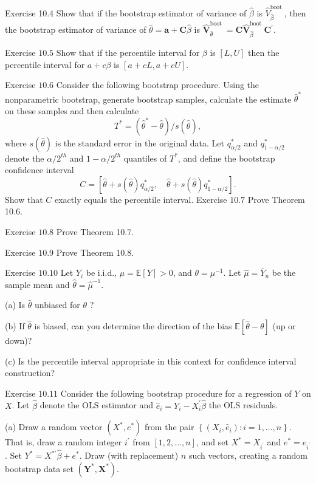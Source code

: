 \documentclass[10pt]{article}
\begin{document}
Exercise 10.4 Show that if the bootstrap estimator of variance of $\widehat{\beta}$ is $\widehat{V}_{\widehat{\beta}}^{\text {boot }}$, then the bootstrap estimator of variance of $\widehat{\theta}=\boldsymbol{a}+\boldsymbol{C} \widehat{\beta}$ is $\widehat{\boldsymbol{V}}_{\widehat{\theta}}^{\text {boot }}=\boldsymbol{C} \widehat{\boldsymbol{V}}_{\widehat{\beta}}^{\text {boot }} \boldsymbol{C}^{\prime}$.

Exercise $10.5$ Show that if the percentile interval for $\beta$ is $[L, U]$ then the percentile interval for $a+c \beta$ is $[a+c L, a+c U]$.

Exercise $10.6$ Consider the following bootstrap procedure. Using the nonparametric bootstrap, generate bootstrap samples, calculate the estimate $\widehat{\theta}^{*}$ on these samples and then calculate
$$
T^{*}=\left(\widehat{\theta}^{*}-\widehat{\theta}\right) / s(\widehat{\theta}),
$$
where $s(\hat{\theta})$ is the standard error in the original data. Let $q_{\alpha / 2}^{*}$ and $q_{1-\alpha / 2}^{*}$ denote the $\alpha / 2^{t h}$ and $1-\alpha / 2^{t h}$ quantiles of $T^{*}$, and define the bootstrap confidence interval
$$
C=\left[\widehat{\theta}+s(\widehat{\theta}) q_{\alpha / 2}^{*}, \quad \widehat{\theta}+s(\widehat{\theta}) q_{1-\alpha / 2}^{*}\right] .
$$
Show that $C$ exactly equals the percentile interval. Exercise $10.7$ Prove Theorem 10.6.

Exercise $10.8$ Prove Theorem 10.7.

Exercise $10.9$ Prove Theorem 10.8.

Exercise $10.10$ Let $Y_{i}$ be i.i.d., $\mu=\mathbb{E}[Y]>0$, and $\theta=\mu^{-1}$. Let $\widehat{\mu}=\bar{Y}_{n}$ be the sample mean and $\widehat{\theta}=\widehat{\mu}^{-1}$.

(a) Is $\hat{\theta}$ unbiased for $\theta$ ?

(b) If $\widehat{\theta}$ is biased, can you determine the direction of the bias $\mathbb{E}[\widehat{\theta}-\theta]$ (up or down)?

(c) Is the percentile interval appropriate in this context for confidence interval construction?

Exercise $10.11$ Consider the following bootstrap procedure for a regression of $Y$ on $X$. Let $\widehat{\beta}$ denote the OLS estimator and $\widehat{e}_{i}=Y_{i}-X_{i}^{\prime} \widehat{\beta}$ the OLS residuals.

(a) Draw a random vector $\left(X^{*}, e^{*}\right)$ from the pair $\left\{\left(X_{i}, \widehat{e}_{i}\right): i=1, \ldots, n\right\}$. That is, draw a random integer $i^{\prime}$ from $[1,2, \ldots, n]$, and set $X^{*}=X_{i^{\prime}}$ and $e^{*}=\widehat{e}_{i^{\prime}}$. Set $Y^{*}=X^{* \prime} \widehat{\beta}+e^{*}$. Draw (with replacement) $n$ such vectors, creating a random bootstrap data set $\left(\boldsymbol{Y}^{*}, \boldsymbol{X}^{*}\right)$.
\end{document}
